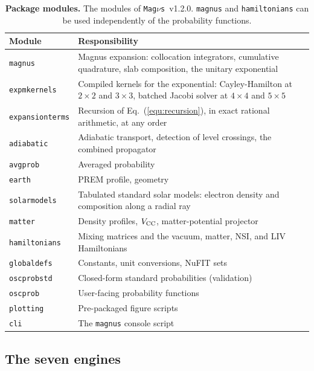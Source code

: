 \documentclass[final,5p,times,twocolumn,sort,compress]{elsarticle}
\makeatletter
\newcommand{\eq}{Eq.}
\DeclareRobustCommand{\_}{%
  \ifmmode\nfss@text{\textunderscore}\else\textunderscore\allowbreak\fi}
\newcommand{\equ}[1]{\eq~(\ref{equ:#1})}
\newcommand{\magnus}{{\tt Mag}\ensuremath{\nu}{\tt s}}
\makeatother
\begin{document}
{\def\arraystretch{1.2}
\begin{table}[t!]
 {\small
 \begin{tabular}{@{}lp{6.1cm}@{}}
 Module & Responsibility \\
 \hline
 {\tt magnus} & Magnus expansion: collocation integrators, cumulative quadrature, slab composition, the unitary exponential \\
 {\tt expmkernels} & Compiled kernels for the exponential: Cayley-Hamilton at $2\times2$ and $3\times3$, batched Jacobi solver at $4\times4$ and $5\times5$ \\
 {\tt expansionterms} & Recursion of \equ{recursion}, in exact rational arithmetic, at any order \\
 {\tt adiabatic} & Adiabatic transport, detection of level crossings, the combined propagator \\
 {\tt avgprob} & Averaged probability \\
 {\tt earth} & PREM profile, geometry \\
 {\tt solarmodels} & Tabulated standard solar models: electron density and composition along a radial ray \\
 {\tt matter} & Density profiles, $V_{\rm CC}$, matter-potential projector \\
 {\tt hamiltonians} & Mixing matrices and the vacuum, matter, NSI, and LIV Hamiltonians \\
 {\tt globaldefs} & Constants, unit conversions, NuFIT sets \\
 {\tt oscprobstd} & Closed-form standard probabilities (validation) \\
 {\tt oscprob} & User-facing probability functions \\
 {\tt plotting} & Pre-packaged figure scripts \\
 {\tt cli} & The {\tt magnus} console script \\
 \end{tabular}}
 \caption{\label{tab:modules}\textbf{Package modules.} The modules of \magnus\ v1.2.0. {\tt magnus} and {\tt hamiltonians} can be used independently of the probability functions.}
\end{table}}


\subsection{The seven engines}
\label{sec:engines}
\end{document}
